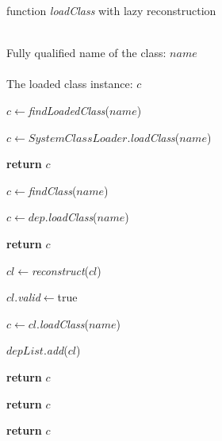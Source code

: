 \documentclass[conference]{IEEEtran}
\begin{document}
\begin{algorithm}[ht]
\caption{function \emph{loadClass} with lazy reconstruction}
\label{alg:lazy_reconstruction}
\begin{algorithmic}[1]
\REQUIRE ~~\\
Fully qualified name of the class: $name$ \\

\ENSURE ~~\\
The loaded class instance: $c$

\STATE $c\leftarrow$\emph{findLoadedClass}($name$)

	
	
		\STATE $c\leftarrow SystemClassLoader.$\emph{loadClass}($name$)
	

			\STATE \textbf{return} $c$
	
		\ENDIF

	\ELSE

		\STATE $c\leftarrow$\emph{findClass}($name$)



				\STATE $c\leftarrow dep.$\emph{loadClass}($name$)

			
					\STATE \textbf{return} $c$

				\ENDIF
			
			\ENDFOR

				


					\STATE $cl\leftarrow$\emph{reconstruct}($cl$)
				
					\STATE $cl.$\emph{valid}$\leftarrow$true

				\ENDIF

				\STATE $c\leftarrow cl.$\emph{loadClass}($name$)


					\STATE $depList$.\emph{add}($cl$)
			
					\STATE \textbf{return} $c$

				\ENDIF
			
			\ENDFOR
	
	
		\ELSE

			\STATE \textbf{return} $c$

		\ENDIF

	\ENDIF

\ELSE

	\STATE \textbf{return} $c$

\ENDIF


\end{algorithmic}
\end{algorithm}
\end{document}
